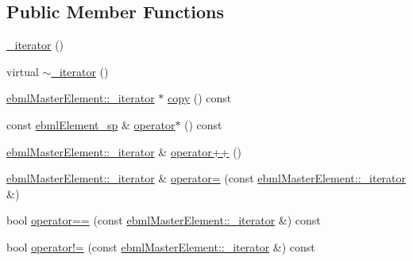 \subsection*{Public Member Functions}
\begin{DoxyCompactItemize}
\item 
\mbox{\hyperlink{classebml_1_1ebmlMap_1_1__iterator_a4cbcb4c34c842171b9b628c681c4e77a}{\+\_\+iterator}} ()
\item 
virtual \mbox{\hyperlink{classebml_1_1ebmlMap_1_1__iterator_a276c17f3a552f25f09735ffb6679fabd}{$\sim$\+\_\+iterator}} ()
\item 
\mbox{\hyperlink{classebml_1_1ebmlMasterElement_1_1__iterator}{ebml\+Master\+Element\+::\+\_\+iterator}} $\ast$ \mbox{\hyperlink{classebml_1_1ebmlMap_1_1__iterator_a4ae1670445455ff5b27e5b3e2bc93142}{copy}} () const
\item 
const \mbox{\hyperlink{namespaceebml_adad533b7705a16bb360fe56380c5e7be}{ebml\+Element\+\_\+sp}} \& \mbox{\hyperlink{classebml_1_1ebmlMap_1_1__iterator_aedbcdd2c78b42961a1f7478fec5080a4}{operator$\ast$}} () const
\item 
\mbox{\hyperlink{classebml_1_1ebmlMasterElement_1_1__iterator}{ebml\+Master\+Element\+::\+\_\+iterator}} \& \mbox{\hyperlink{classebml_1_1ebmlMap_1_1__iterator_aa35aad1b71670402a6152989c9b0cf6b}{operator++}} ()
\item 
\mbox{\hyperlink{classebml_1_1ebmlMasterElement_1_1__iterator}{ebml\+Master\+Element\+::\+\_\+iterator}} \& \mbox{\hyperlink{classebml_1_1ebmlMap_1_1__iterator_af9aa2621f2b2d78c75a473b3c4b94fc4}{operator=}} (const \mbox{\hyperlink{classebml_1_1ebmlMasterElement_1_1__iterator}{ebml\+Master\+Element\+::\+\_\+iterator}} \&)
\item 
bool \mbox{\hyperlink{classebml_1_1ebmlMap_1_1__iterator_abda291b4e2305234d8215d4a3b03e7a5}{operator==}} (const \mbox{\hyperlink{classebml_1_1ebmlMasterElement_1_1__iterator}{ebml\+Master\+Element\+::\+\_\+iterator}} \&) const
\item 
bool \mbox{\hyperlink{classebml_1_1ebmlMap_1_1__iterator_a42189d25979dab96126d411ab83a3849}{operator!=}} (const \mbox{\hyperlink{classebml_1_1ebmlMasterElement_1_1__iterator}{ebml\+Master\+Element\+::\+\_\+iterator}} \&) const
\end{DoxyCompactItemize}
